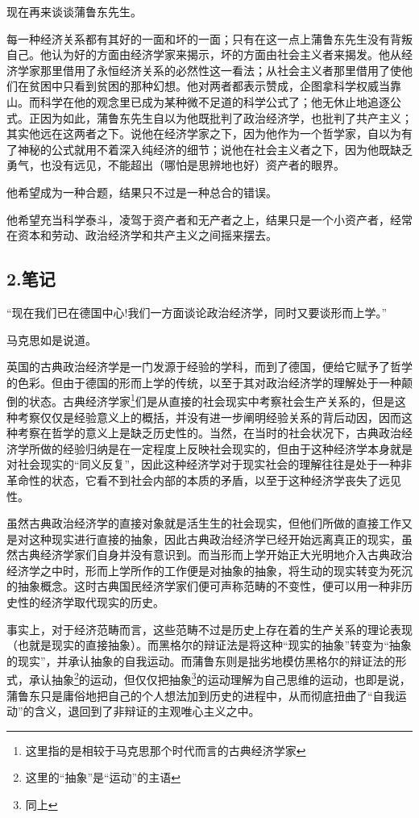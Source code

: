 \documentclass[a4paper,twoside,12pt,AutoFakeBold]{ctexart}
\begin{document}
现在再来谈谈蒲鲁东先生。

每一种经济关系都有其好的一面和坏的一面；只有在这一点上蒲鲁东先生没有背叛自己。他认为好的方面由经济学家来揭示，坏的方面由社会主义者来揭发。他从经济学家那里借用了永恒经济关系的必然性这一看法；从社会主义者那里借用了使他们在贫困中只看到贫困的那种幻想。他对两者都表示赞成，企图拿科学权威当靠山。而科学在他的观念里已成为某种微不足道的科学公式了；他无休止地追逐公式。正因为如此，蒲鲁东先生自以为他既批判了政治经济学，也批判了共产主义；其实他远在这两者之下。说他在经济学家之下，因为他作为一个哲学家，自以为有了神秘的公式就用不着深入纯经济的细节；说他在社会主义者之下，因为他既缺乏勇气，也没有远见，不能超出（哪怕是思辨地也好）资产者的眼界。

他希望成为一种合题，结果只不过是一种总合的错误。

他希望充当科学泰斗，凌驾于资产者和无产者之上，结果只是一个小资产者，经常在资本和劳动、政治经济学和共产主义之间摇来摆去。

\newpage

\subsection{2.笔记}
\begin{fangsong}
    “现在我们已在德国中心!我们一方面谈论政治经济学，同时又要谈形而上学。”
\end{fangsong}
马克思如是说道。

英国的古典政治经济学是一门发源于经验的学科，而到了德国，便给它赋予了哲学的色彩。但由于德国的形而上学的传统，以至于其对政治经济学的理解处于一种颠倒的状态。古典经济学家\footnote{这里指的是相较于马克思那个时代而言的古典经济学家}们是从直接的社会现实中考察社会生产关系的，但是这种考察仅仅是经验意义上的概括，并没有进一步阐明经验关系的背后动因，因而这种考察在哲学的意义上是缺乏历史性的。当然，在当时的社会状况下，古典政治经济学所做的经验归纳是在一定程度上反映社会现实的，但由于这种经济学本身就是对社会现实的“同义反复”，因此这种经济学对于现实社会的理解往往是处于一种非革命性的状态，它看不到社会内部的本质的矛盾，以至于这种经济学丧失了远见性。

虽然古典政治经济学的直接对象就是活生生的社会现实，但他们所做的直接工作又是对这种现实进行直接的抽象，因此古典政治经济学已经开始远离真正的现实，虽然古典经济学家们自身并没有意识到。而当形而上学开始正大光明地介入古典政治经济学之中时，形而上学所作的工作便是对抽象的抽象，将生动的现实转变为死沉的抽象概念。这时古典国民经济学家们便可声称范畴的不变性，便可以用一种非历史性的经济学取代现实的历史。

事实上，对于经济范畴而言，这些范畴不过是历史上存在着的生产关系的理论表现（也就是现实的直接抽象）。而黑格尔的辩证法是将这种“现实的抽象”转变为“抽象的现实”，并承认抽象的自我运动。而蒲鲁东则是拙劣地模仿黑格尔的辩证法的形式，承认抽象\footnote{这里的“抽象”是“运动”的主语}的运动，但仅仅把抽象\footnote{同上}的运动理解为自己思维的运动，也即是说，蒲鲁东只是庸俗地把自己的个人想法加到历史的进程中，从而彻底扭曲了“自我运动”的含义，退回到了非辩证的主观唯心主义之中。
\end{document}
